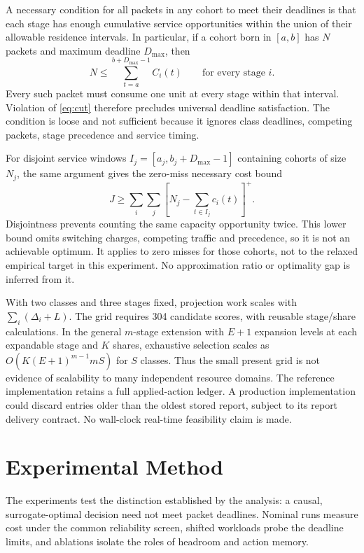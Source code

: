 \documentclass{IEEEoj}
\begin{document}
A necessary condition for all packets in any cohort to meet their deadlines
is that each stage has enough cumulative service opportunities within the
union of their allowable residence intervals. In particular, if a cohort born
in $[a,b]$ has $N$ packets and maximum deadline $D_{\max}$, then
\begin{equation}
 N\le\sum_{t=a}^{b+D_{\max}-1} C_i(t)\qquad\text{for every stage }i.\label{eq:cut}
\end{equation}
Every such packet must consume one unit at every stage within that interval.
Violation of \eqref{eq:cut} therefore precludes universal deadline satisfaction.
The condition is loose and not sufficient because it ignores class deadlines,
competing packets, stage precedence and service timing.

For disjoint service windows $I_j=[a_j,b_j+D_{\max}-1]$ containing
cohorts of size $N_j$, the same argument gives the zero-miss necessary cost bound
\begin{equation}
 J\ge\sum_i\sum_j\left[N_j-\sum_{t\in I_j}c_i(t)\right]^+.
\end{equation}
Disjointness prevents counting the same capacity opportunity twice. This lower
bound omits switching charges, competing traffic and precedence, so it is not
an achievable optimum. It applies to zero misses for those cohorts, not to
the relaxed empirical target in this experiment. No approximation ratio or
optimality gap is inferred from it.

With two classes and three stages fixed, projection work scales with
$\sum_i(\Delta_i+L)$. The grid requires 304 candidate scores, with reusable
stage/share calculations. In the general $m$-stage extension with $E+1$
expansion levels at each expandable stage and $K$ shares, exhaustive selection
scales as $O(K(E+1)^{m-1}mS)$ for $S$ classes. Thus the small present grid is
not evidence of scalability to many independent resource domains. The reference
implementation retains a full applied-action ledger. A production implementation
could discard entries older than the oldest stored report, subject to its report
delivery contract. No wall-clock real-time feasibility claim is made.



\section{Experimental Method}
The experiments test the distinction established by the analysis: a causal,
surrogate-optimal decision need not meet packet deadlines. Nominal runs measure
cost under the common reliability screen, shifted workloads probe the deadline
limits, and ablations isolate the roles of headroom and action memory.
\end{document}
